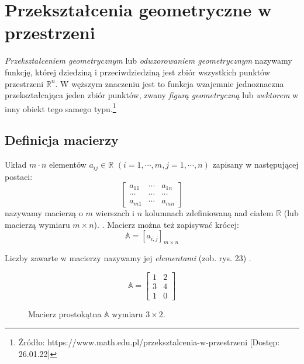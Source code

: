 \chapter{Przekształcenia geometryczne w przestrzeni}

\textit{Przekształceniem geometrycznym} lub \textit{odwzorowaniem geometrycznym} nazywamy funkcję, której dziedziną i przeciwdziedziną jest zbiór wszystkich punktów przestrzeni $\mathbb{R}^{n}$. W węższym znaczeniu jest to funkcja wzajemnie jednoznaczna przekształcająca jeden zbiór punktów, zwany \textit{figurą geometryczną} lub \textit{wektorem} w inny obiekt tego samego typu.\footnote{Źródło: https://www.math.edu.pl/przeksztalcenia-w-przestrzeni [Dostęp: 26.01.22]} 

\section{Definicja macierzy}
Układ $m \cdot n$ elementów $a_{ij} \in \mathbb{R}$ $(i = 1,\cdots,m, j = 1,\cdots,n)$ zapisany w następującej postaci:
\begin{equation*}
    \begin{bmatrix}
    a_{11} & \cdots & a_{1n} \\
    \cdots & \cdots & \cdots \\
    a_{m1} & \cdots & a_{mn}
    \end{bmatrix}
\end{equation*}
nazywamy macierzą o $m$ wierszach i $n$ kolumnach zdefiniowaną nad ciałem $\mathbb{R}$ (lub macierzą wymiaru $m \times n$). \citep[s. 85]{Repetytorium1977}.
Macierz można też zapisywać krócej:
\begin{equation*}
\mathbb{A} = [a_{i,j}]_{m\times n}    
\end{equation*}

Liczby zawarte w macierzy nazywamy jej \textit{elementami} (zob. rys. 23) \citep[s. 18]{Rutkowski_2008}.

\begin{figure}[H]
\begin{equation*}
\mathbb{A} =
    \begin{bmatrix}
    1 & 2 \\
    3 & 4 \\
    1 & 0
    \end{bmatrix}
\end{equation*}
\centering
\caption{Macierz prostokątna $\mathbb{A }$ wymiaru $3 \times 2$.}
\end{figure}

